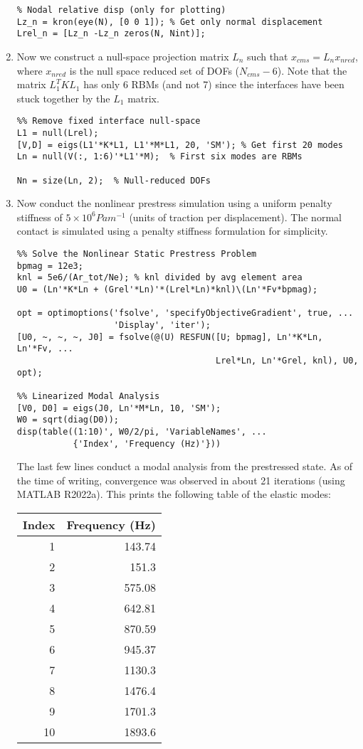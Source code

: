 \documentclass[11pt]{article}
\begin{document}
\begin{enumerate}
\begin{verbatim}
% Nodal relative disp (only for plotting)
Lz_n = kron(eye(N), [0 0 1]); % Get only normal displacement
Lrel_n = [Lz_n -Lz_n zeros(N, Nint)];
\end{verbatim}
\item Now we construct a null-space projection matrix \(L_n\) such that \(x_{cms} = L_n x_{nred}\), where \(x_{nred}\) is the null space reduced set of DOFs (\(N_{cms}-6\)).
Note that the matrix \(L_1^T K L_1\) has only 6 RBMs (and not 7) since the interfaces have been stuck together by the \(L_1\) matrix.
\begin{verbatim}
%% Remove fixed interface null-space
L1 = null(Lrel);
[V,D] = eigs(L1'*K*L1, L1'*M*L1, 20, 'SM'); % Get first 20 modes
Ln = null(V(:, 1:6)'*L1'*M);  % First six modes are RBMs

Nn = size(Ln, 2);  % Null-reduced DOFs
\end{verbatim}
\item Now conduct the nonlinear prestress simulation using a uniform penalty stiffness of \(5\times 10^6 Pa m^{-1}\) (units of traction per displacement).
The normal contact is simulated using a penalty stiffness formulation for simplicity.
\begin{verbatim}
%% Solve the Nonlinear Static Prestress Problem
bpmag = 12e3;
knl = 5e6/(Ar_tot/Ne); % knl divided by avg element area
U0 = (Ln'*K*Ln + (Grel'*Ln)'*(Lrel*Ln)*knl)\(Ln'*Fv*bpmag);

opt = optimoptions('fsolve', 'specifyObjectiveGradient', true, ...
                   'Display', 'iter');
[U0, ~, ~, ~, J0] = fsolve(@(U) RESFUN([U; bpmag], Ln'*K*Ln, Ln'*Fv, ...
                                       Lrel*Ln, Ln'*Grel, knl), U0, opt);

%% Linearized Modal Analysis
[V0, D0] = eigs(J0, Ln'*M*Ln, 10, 'SM');
W0 = sqrt(diag(D0));
disp(table((1:10)', W0/2/pi, 'VariableNames', ...
           {'Index', 'Frequency (Hz)'}))
\end{verbatim}
The last few lines conduct a modal analysis from the prestressed state.
As of the time of writing, convergence was observed in about 21 iterations (using MATLAB R2022a).
This prints the following table of the elastic modes:
\begin{center}
\begin{tabular}{rr}
Index & Frequency (Hz)\\[0pt]
\hline
1 & 143.74\\[0pt]
2 & 151.3\\[0pt]
3 & 575.08\\[0pt]
4 & 642.81\\[0pt]
5 & 870.59\\[0pt]
6 & 945.37\\[0pt]
7 & 1130.3\\[0pt]
8 & 1476.4\\[0pt]
9 & 1701.3\\[0pt]
10 & 1893.6\\[0pt]
\end{tabular}
\end{center}
\end{enumerate}
\end{document}
